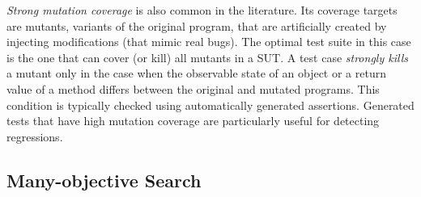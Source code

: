 \documentclass[paper=a4,%
  twoside,%
  BCOR4mm,%
  abstract=true,%
  toc=bibliography,%
  chapterprefix=true,%
  toc=bibliographynumbered,%
  open=right,%
  english,%
  pagesize=pdftex]{scrreprt}
\begin{document}
\textit{Strong mutation coverage} is also common in the literature. Its coverage targets are mutants, variants of the original program, that are artificially created by injecting modifications (that mimic real bugs). The optimal test suite in this case is the one that can cover (or kill) all mutants in a \ac{SUT}. A test case \textit{strongly kills} a mutant only in the case when the observable state of an object or a return value of a method differs between the original and mutated programs. This condition is typically checked using automatically generated assertions. Generated tests that have high mutation coverage are particularly useful for detecting regressions.


\subsection{Many-objective Search}
\end{document}
